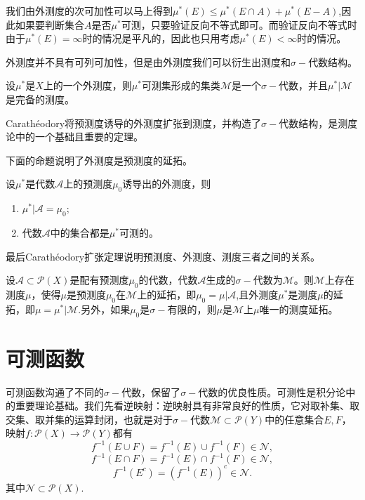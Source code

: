 \documentclass[lang=cn,10pt]{elegantbook}
\begin{document}
	\begin{note}
		我们由外测度的次可加性可以马上得到\(\mu^*(E)\le \mu^*(E\cap A)+\mu^*(E-A)\),因此如果要判断集合\(A\)是否\(\mu^*\)可测，只要验证反向不等式即可。而验证反向不等式时由于\(\mu^*(E)=\infty\)时的情况是平凡的，因此也只用考虑\(\mu^*(E)<\infty\)时的情况。
	\end{note}
	外测度并不具有可列可加性，但是由外测度我们可以衍生出测度和\(\sigma-\)代数结构。
	\begin{theorem}
		设\(\mu^*\)是\(X\)上的一个外测度，则\(\mu^*\)可测集形成的集类\(\mathcal{M}\)是一个\(\sigma-\)代数，并且\(\mu^*|\mathcal{M}\)是完备的测度。
	\end{theorem}
	\begin{note}
		Carath\'{e}odory将预测度诱导的外测度扩张到测度，并构造了\(\sigma-\)代数结构，是测度论中的一个基础且重要的定理。
	\end{note}
	下面的命题说明了外测度是预测度的延拓。
	\begin{proposition}[P1.13]
		设\(\mu^*\)是代数\(\mathcal{A}\)上的预测度\(\mu_0\)诱导出的外测度，则
		\begin{enumerate}
			\item \(\mu^*|\mathcal{A}=\mu_0\);
			\item 代数\(\mathcal{A}\)中的集合都是\(\mu^*\)可测的。
		\end{enumerate}
	\end{proposition}
	最后Carath\'{e}odory扩张定理说明预测度、外测度、测度三者之间的关系。
	\begin{theorem}
		设\(\mathcal{A}\subset \mathcal{P}(X)\)是配有预测度\(\mu_0\)的代数，代数\(\mathcal{A}\)生成的\(\sigma-\)代数为\(\mathcal{M}\)。则\(\mathcal{M}\)上存在测度\(\mu\)，使得\(\mu\)是预测度\(\mu_0\)在\(\mathcal{M}\)上的延拓，即\(\mu_0=\mu|\mathcal{A}\),且外测度\(\mu^*\)是测度\(\mu\)的延拓，即\(\mu=\mu^*|\mathcal{M}\).另外，如果\(\mu_0\)是\(\sigma-\)有限的，则\(\mu\)是\(\mathcal{M}\)上\(\mu\)唯一的测度延拓。
	\end{theorem}

	\section{可测函数}
	可测函数沟通了不同的\(\sigma-\)代数，保留了\(\sigma-\)代数的优良性质。可测性是积分论中的重要理论基础。我们先看逆映射：逆映射具有非常良好的性质，它对取补集、取交集、取并集的运算封闭，也就是对于\(\sigma-\)代数\(\mathcal{M}\subset \mathcal{P}(Y)\)中的任意集合\(E,F\)，映射\(f:\mathcal{P}(X)\to \mathcal{P}(Y)\)都有
	\[f^{-1}(E\cup F)=f^{-1}(E)\cup f^{-1}(F)\in\mathcal{N},\]
	\[f^{-1}(E\cap F)=f^{-1}(E)\cap f^{-1}(F)\in\mathcal{N},\]
	\[f^{-1}(E^c)=(f^{-1}(E))^c\in\mathcal{N}.\]
	其中\(\mathcal{N}\subset \mathcal{P}(X)\).
\end{document}
